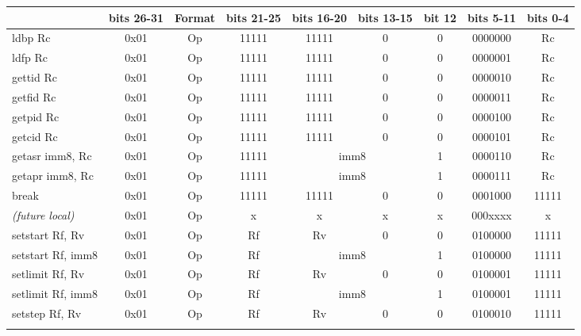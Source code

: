 \documentclass[a4paper,11pt]{article}
\begin{document}
\begin{table}
\begin{center}{\scriptsize

\begin{tabular}{|>{\ttfamily}l||c|c|c|c|c|c|c|c|}
\hline
{\normalfont Assembly pattern} & bits 26-31 & Format & bits 21-25 & bits 16-20 & bits 13-15 & bit 12 & bits 5-11 & bits 0-4 \\
\hline \hline
ldbp Rc                 & 0x01 & Op     & 11111 &                    11111 & 0 & 0 & 0000000 & Rc \\
ldfp Rc                 & 0x01 & Op     & 11111 &                    11111 & 0 & 0 & 0000001 & Rc \\
gettid Rc               & 0x01 & Op     & 11111 &                    11111 & 0 & 0 & 0000010 & Rc \\
getfid Rc               & 0x01 & Op     & 11111 &                    11111 & 0 & 0 & 0000011 & Rc \\
getpid Rc               & 0x01 & Op     & 11111 &                    11111 & 0 & 0 & 0000100 & Rc \\
getcid Rc               & 0x01 & Op     & 11111 &                    11111 & 0 & 0 & 0000101 & Rc \\ \cline{5-6}
getasr imm8, Rc         & 0x01 & Op     & 11111 & \multicolumn{2}{c|}{imm8} & 1 & 0000110 & Rc \\ \cline{5-6}
getapr imm8, Rc         & 0x01 & Op     & 11111 & \multicolumn{2}{c|}{imm8} & 1 & 0000111 & Rc \\ \cline{5-6}
\hline \hline
break                   & 0x01 & Op     & 11111 &                    11111 & 0 & 0 & 0001000 & 11111 \\
\hline\hline
\normalfont \emph{(future local)} & 0x01 & Op & x & x & x & x & 000xxxx & x \\
\hline\hline
setstart Rf, Rv         & 0x01 & Op     & Rf &                    Rv & 0 & 0 & 0100000 & 11111 \\ \cline{5-6}
setstart Rf, imm8       & 0x01 & Op     & Rf & \multicolumn{2}{c|}{imm8} & 1 & 0100000 & 11111 \\ \cline{5-6}
setlimit Rf, Rv         & 0x01 & Op     & Rf &                    Rv & 0 & 0 & 0100001 & 11111 \\ \cline{5-6}
setlimit Rf, imm8       & 0x01 & Op     & Rf & \multicolumn{2}{c|}{imm8} & 1 & 0100001 & 11111 \\ \cline{5-6}
setstep  Rf, Rv         & 0x01 & Op     & Rf &                    Rv & 0 & 0 & 0100010 & 11111 \\ \cline{5-6}

\end{tabular}}
\end{center}
\end{table}
\end{document}
